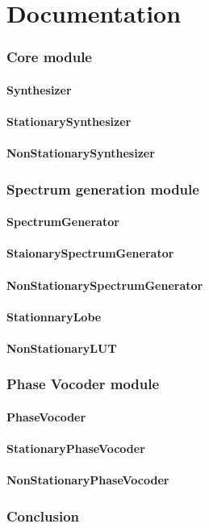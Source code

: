 \documentclass[]{article}
\begin{document}
\newpage
\part{Documentation}\label{sec:documentation}
\section{Core module}
\subsection{Synthesizer}
\subsection{StationarySynthesizer}
\subsection{NonStationarySynthesizer}
\section{Spectrum generation module}\label{sec:spectrum-generation-module}
\subsection{SpectrumGenerator}\label{sec:spectrumgenerator}
\subsection{StaionarySpectrumGenerator}\label{sec:staionaryspectrumgenerator}
\subsection{NonStationarySpectrumGenerator}\label{sec:nonstationaryspectrumgenerator}
\subsection{StationnaryLobe}\label{sec:stationnarylobe}
\subsection{NonStationaryLUT}\label{sec:nonstationarylut}
\section{Phase Vocoder module}\label{sec:phase-vocoder-module}
\subsection{PhaseVocoder}\label{sec:phasevocoder}
\subsection{StationaryPhaseVocoder}\label{sec:stationaryphasevocoder}
\subsection{NonStationaryPhaseVocoder}\label{sec:nonstationaryphasevocoder}

\newpage
\section*{Conclusion}

\newpage


\end{document}
